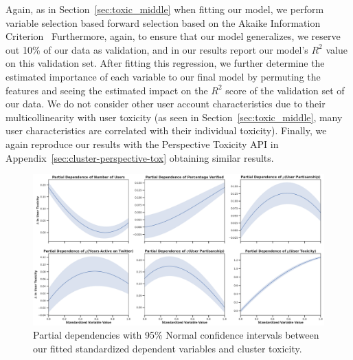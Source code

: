 Again, as in Section~\ref{sec:toxic_middle} when fitting our model, we perform variable selection based forward selection based on the Akaike Information Criterion~\cite{akaike2011akaike} Furthermore, again, to ensure that our model generalizes, we reserve out 10\% of our data as validation, and in our results report our model's $R^2$ value on this validation set. After fitting this regression, we further determine the estimated importance of each variable to our final model by permuting the features and seeing the estimated impact on the $R^2$ score of the validation set of our data. We do not consider other user account characteristics due to their multicollinearity with user toxicity (as seen in Section~\ref{sec:toxic_middle}, many user characteristics are correlated with their individual toxicity). Finally, we again reproduce our results with the Perspective Toxicity API in Appendix~\ref{sec:cluster-perspective-tox} obtaining similar results.


\begin{figure}
\begin{minipage}[l]{1.0\textwidth}
\includegraphics[width=1\columnwidth]{figures/partial_dependence_important_variables-clusterlevel-1.pdf} 
\end{minipage}
\begin{minipage}[l]{1\textwidth}
\caption{Partial dependencies with 95\% Normal confidence intervals between our fitted standardized dependent variables and cluster toxicity.}
\label{fig:partial-dependcies-clusterlevel}
\end{minipage}

\end{figure}

